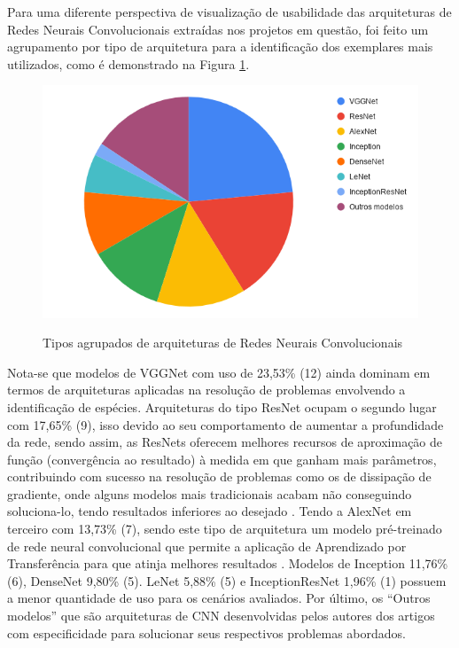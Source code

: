 \documentclass[
	12pt,				%
	oneside,			%
	a4paper,			%
	english,			%
	brazil				%
	]{abntex2ppgsi}
\begin{document}
Para uma diferente perspectiva de visualização de usabilidade das arquiteturas de Redes Neurais Convolucionais extraídas nos projetos em questão, foi feito um agrupamento por tipo de arquitetura para a identificação dos exemplares mais utilizados, como é demonstrado na Figura \ref{fig:grafico_arquitetura_agrupada_vs_uso}.

\begin{figure}[H]
    \centering
    \caption{Tipos agrupados de arquiteturas de Redes Neurais Convolucionais}
    \includegraphics[scale=.60]{imagens/revisao_sistematica/grafico_arquitetura_agrupada_vs_uso.png}
    \label{fig:grafico_arquitetura_agrupada_vs_uso}
\end{figure}

Nota-se que modelos de VGGNet com uso de 23,53\% (12) ainda dominam em termos de arquiteturas aplicadas na resolução de problemas envolvendo a identificação de espécies. Arquiteturas do tipo ResNet ocupam o segundo lugar com 17,65\% (9), isso devido ao seu comportamento de aumentar a profundidade da rede, sendo assim, as ResNets oferecem melhores recursos de aproximação de função (convergência ao resultado) à medida em que ganham mais parâmetros, contribuindo com sucesso na resolução de problemas como os de dissipação de gradiente, onde alguns modelos mais tradicionais acabam não conseguindo soluciona-lo, tendo resultados inferiores ao desejado \cite{sun2017deep}. Tendo a AlexNet em terceiro com 13,73\% (7), sendo este tipo de arquitetura um modelo pré-treinado de rede neural convolucional que permite a aplicação de Aprendizado por Transferência para que atinja melhores resultados \cite{hongclassification}. Modelos de Inception 11,76\% (6), DenseNet 9,80\% (5). LeNet 5,88\% (5) e InceptionResNet 1,96\% (1) possuem a menor quantidade de uso para os cenários avaliados. Por último, os ``Outros modelos'' que são arquiteturas de CNN desenvolvidas pelos autores dos artigos com especificidade para solucionar seus respectivos problemas abordados.
\end{document}
